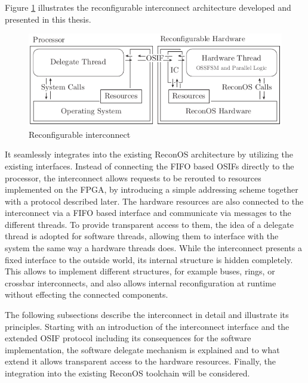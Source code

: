 Figure \ref{fig:interconnect} illustrates the reconfigurable interconnect
architecture developed and presented in this thesis.
\begin{figure}[tb]
	\centering
	\includegraphics{../figures/interconnect}
	\caption{Reconfigurable interconnect}
	\label{fig:interconnect}
\end{figure}
It seamlessly integrates into the existing ReconOS architecture by utilizing
the existing interfaces. Instead of connecting the \ac{FIFO} based \acp{OSIF}
directly to the processor, the interconnect allows requests to be rerouted to
resources implemented on the \ac{FPGA}, by introducing a simple addressing
scheme together with a protocol described later. The hardware resources are
also connected to the interconnect via a \ac{FIFO} based interface and
communicate via messages to the different threads. To provide transparent
access to them, the idea of a delegate thread is adopted for software threads,
allowing them to interface with the system the same way a hardware threads
does. While the interconnect presents a fixed interface to the outside world,
its internal structure is hidden completely. This allows to implement
different structures, for example buses, rings, or crossbar interconnects, and
also allows internal reconfiguration at runtime without effecting the
connected components.

The following subsections describe the interconnect in detail and illustrate
its principles. Starting with an introduction of the interconnect interface
and the extended \ac{OSIF} protocol including its consequences for the
software implementation, the software delegate mechanism is explained and to
what extend it allows transparent access to the hardware resources. Finally,
the integration into the existing ReconOS toolchain will be considered.

